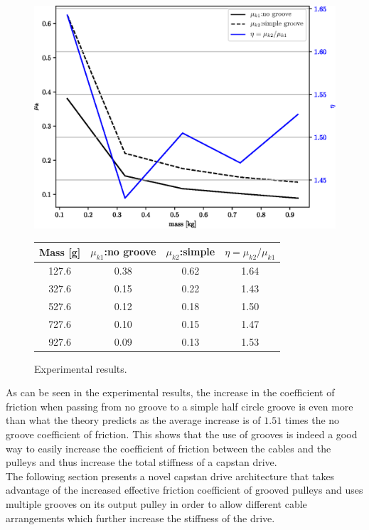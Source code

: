 \documentclass[10pt,cleanfoot]{asme2ej}
\begin{document}
\begin{figure}
\centering
\includegraphics[width=0.47\columnwidth]{fig_exp.eps}
\qquad
\begin{tabular}[b]{cccc}\hline
      Mass [g] & $\mu_{k1}$:no groove & $\mu_{k2}$:simple & $\eta=\mu_{k2}/\mu_{k1}$\\ \hline
      127.6 & 0.38 & 0.62 & 1.64\\
      327.6 & 0.15 & 0.22 & 1.43\\
      527.6 & 0.12 & 0.18 & 1.50\\
      727.6 & 0.10 & 0.15 & 1.47\\
      927.6 & 0.09 & 0.13 & 1.53\\ \hline
      
    \end{tabular}
    \label{tab:exp_tab}
    \captionsetup{labelformat=andtable}
    \caption{Experimental results.}
\end{figure}
\par
As can be seen in the experimental results, the increase in the coefficient of friction when passing from no groove to a simple half circle groove is even more than what the theory predicts as the average increase is of $1.51$ times the no groove coefficient of friction. This shows that the use of grooves is indeed a good way to easily increase the coefficient of friction between the cables and the pulleys and thus increase the total stiffness of a capstan drive.
\\ 
 The following section presents a novel capstan drive architecture that takes advantage of the increased effective friction coefficient of grooved pulleys and uses multiple grooves on its output pulley in order to allow different cable arrangements which further increase the stiffness of the drive.
\end{document}
